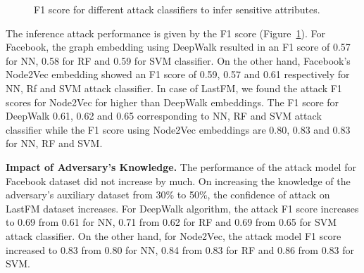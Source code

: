 \begin{figure}[!htb]
    \centering
    \begin{minipage}[b]{1\linewidth}
    \centering

    \end{minipage}
\vspace{-3mm}
    \caption{F1 score for different attack classifiers to infer sensitive attributes.}
    \label{fig:aia}
\end{figure}

The inference attack performance is given by the F1 score (Figure~\ref{fig:aia}). %
For Facebook, the graph embedding using DeepWalk resulted in an F1 score of 0.57 for NN, 0.58 for RF and 0.59 for SVM classifier.
On the other hand, Facebook's Node2Vec embedding showed an F1 score of 0.59, 0.57 and 0.61 respectively for NN, Rf and SVM attack classifier.
In case of LastFM, we found the attack F1 scores for Node2Vec for higher than DeepWalk embeddings.
The F1 score for DeepWalk 0.61, 0.62 and 0.65 corresponding to NN, RF and SVM attack classifier while the F1 score using Node2Vec embeddings are 0.80, 0.83 and 0.83 for NN, RF and SVM.

\textbf{Impact of Adversary's Knowledge.} The performance of the attack model for Facebook dataset did not increase by much.
On increasing the knowledge of the adversary's auxiliary dataset from 30\% to 50\%, the confidence of attack on LastFM dataset increases.
For DeepWalk algorithm, the attack F1 score increases to 0.69 from 0.61 for NN, 0.71 from 0.62 for RF and 0.69 from 0.65 for SVM attack classifier.
On the other hand, for Node2Vec, the attack model F1 score increased to 0.83 from 0.80 for NN, 0.84 from 0.83 for RF and 0.86 from 0.83 for SVM.
